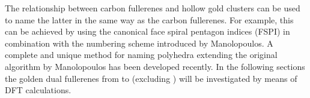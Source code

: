 The relationship between carbon fullerenes and hollow gold clusters can be used
to name the latter in the same way as the carbon fullerenes. For example, this
can be achieved by using the canonical face spiral pentagon indices (FSPI) in
combination with the numbering scheme introduced by
Manolopoulos.\autocite{Fowler-atlas-2006} A complete and unique method for
naming polyhedra extending the original algorithm by Manolopoulos has been
developed recently.\autocite{Wirz_Namingpolyhedrageneral_2018} In the following
sections the golden dual fullerenes from  to  (excluding
) will be investigated by means of \ac{DFT} calculations.



